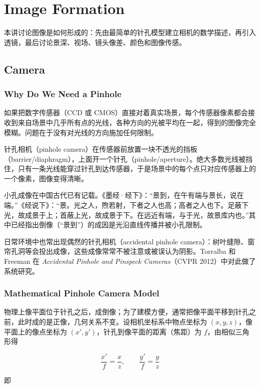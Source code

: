 \section{Image Formation}

本讲讨论图像是如何形成的：先由最简单的针孔模型建立相机的数学描述，再引入透镜，最后讨论景深、视场、镜头像差、颜色和图像传感。

\subsection{Camera}

\subsubsection{Why Do We Need a Pinhole}

如果把数字传感器（CCD 或 CMOS）直接对着真实场景，每个传感器像素都会接收到来自场景中几乎所有点的光线，各种方向的光被平均在一起，得到的图像完全模糊。问题在于没有对光线的方向施加任何限制。

针孔相机（pinhole camera）在传感器前放置一块不透光的挡板（barrier/diaphragm），上面开一个针孔（pinhole/aperture）。绝大多数光线被挡住，只有一条光线能穿过针孔到达传感器，于是场景中的每个点只对应传感器上的一个像素，图像变得清晰。

小孔成像在中国古代已有记载。《墨经·经下》：“景到，在午有端与景长，说在端。”《经说下》：“景。光之人，煦若射，下者之人也高；高者之人也下。足蔽下光，故成景于上；首蔽上光，故成景于下。在远近有端，与于光，故景库内也。”其中已经指出倒像（“景到”）的成因是光沿直线传播并被小孔限制。

日常环境中也常出现偶然的针孔相机（accidental pinhole camera）：树叶缝隙、窗帘孔洞等会投出成像，这些成像常常不被注意或被误认为阴影。Torralba 和 Freeman 在 \textit{Accidental Pinhole and Pinspeck Cameras}（CVPR 2012）中对此做了系统研究。

\subsubsection{Mathematical Pinhole Camera Model}

物理上像平面位于针孔之后，成倒像；为了建模方便，通常把像平面平移到针孔之前，此时成的是正像，几何关系不变。设相机坐标系中物点坐标为 $(x,y,z)$，像平面上的像点坐标为 $(x',y')$，针孔到像平面的距离（焦距）为 $f$，由相似三角形得

\[
\frac{x'}{f} = \frac{x}{z}, \qquad \frac{y'}{f} = \frac{y}{z}
\]

即

